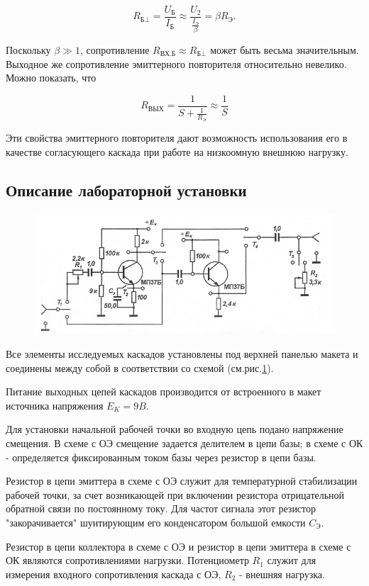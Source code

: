 $$R_{\text{Б} \bot}=\frac{U_{\text{Б}}}{I_{\text{Б}}} \approx \frac{U_2}{ \frac{ I_{ \text{Э} } }{\beta}}=\beta R_{\text{Э}}.$$

Поскольку $\beta \gg 1$, сопротивление  $R_{\text{ВХ.Б}} \approx R_{\text{Б} \bot}$ может быть весьма значительным. Выходное же сопротивление эмиттерного повторителя относительно невелико. Можно показать, что

$$R_{\text{ВЫХ}}=\frac{1}{S+\frac{1}{R_{\text{Э}}}} \approx \frac{1}{S}$$

Эти свойства эмиттерного повторителя дают возможность использования его в качестве согласующего каскада при работе на низкоомную внешнюю нагрузку.

\subsection{Описание лабораторной установки}
\begin{figure}[h!]
	\centering
	\includegraphics[width=\linewidth]{fig/fig7}
	\caption{}
	\label{fig:7}
\end{figure}
Все элементы исследуемых каскадов установлены под верхней панелью макета и соединены между собой в соответствии со схемой (см.рис.\ref{fig:7}).

Питание выходных цепей каскадов производится от встроенного в макет источника напряжения $E_K=9B$.

Для установки начальной рабочей точки во входную цепь подано напряжение смещения. В схеме с ОЭ смещение задается делителем в цепи базы; в схеме с ОК - определяется фиксированным током базы через резистор в цепи базы.

Резистор в цепи эмиттера в схеме с ОЭ служит для температурной стабилизации рабочей точки, за счет возникающей при включении резистора отрицательной обратной связи по постоянному току. Для частот сигнала этот резистор "закорачивается" шунтирующим его конденсатором большой емкости $C_{\text{Э}}$.

Резистор в цепи коллектора в схеме с ОЭ и резистор в цепи эмиттера в схеме с ОК являются сопротивлениями нагрузки. Потенциометр $R_1$ служит для измерения входного сопротивления
каскада с ОЭ, $R_2$ - внешняя нагрузка.

